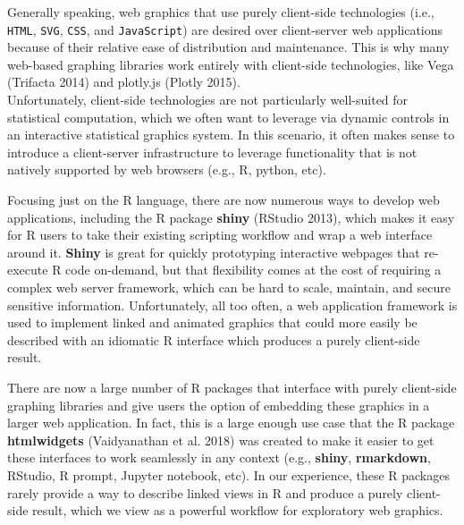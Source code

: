 \documentclass[12pt,]{article}
\theoremstyle{definition}
\theoremstyle{definition}
\theoremstyle{definition}
\theoremstyle{remark}
\begin{document}
Generally speaking, web graphics that use purely client-side
technologies (i.e., \texttt{HTML}, \texttt{SVG}, \texttt{CSS}, and
\texttt{JavaScript}) are desired over client-server web applications
because of their relative ease of distribution and maintenance. This is
why many web-based graphing libraries work entirely with client-side
technologies, like Vega (Trifacta 2014) and plotly.js (Plotly 2015).\\
Unfortunately, client-side technologies are not particularly well-suited
for statistical computation, which we often want to leverage via dynamic
controls in an interactive statistical graphics system. In this
scenario, it often makes sense to introduce a client-server
infrastructure to leverage functionality that is not natively supported
by web browsers (e.g., R, python, etc).

Focusing just on the R language, there are now numerous ways to develop
web applications, including the R package \textbf{shiny} (RStudio 2013),
which makes it easy for R users to take their existing scripting
workflow and wrap a web interface around it. \textbf{Shiny} is great for
quickly prototyping interactive webpages that re-execute R code
on-demand, but that flexibility comes at the cost of requiring a complex
web server framework, which can be hard to scale, maintain, and secure
sensitive information. Unfortunately, all too often, a web application
framework is used to implement linked and animated graphics that could
more easily be described with an idiomatic R interface which produces a
purely client-side result.

There are now a large number of R packages that interface with purely
client-side graphing libraries and give users the option of embedding
these graphics in a larger web application. In fact, this is a large
enough use case that the R package \textbf{htmlwidgets} (Vaidyanathan et
al. 2018) was created to make it easier to get these interfaces to work
seamlessly in any context (e.g., \textbf{shiny}, \textbf{rmarkdown},
RStudio, R prompt, Jupyter notebook, etc). In our experience, these R
packages rarely provide a way to describe linked views in R and produce
a purely client-side result, which we view as a powerful workflow for
exploratory web graphics.
\end{document}
